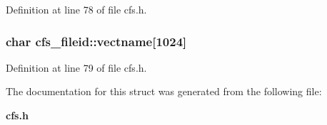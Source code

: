 Definition at line 78 of file cfs.h.
\subsubsection{\setlength{\rightskip}{0pt plus 5cm}char {\bf cfs\_\-fileid::vectname}[1024]}\label{structcfs__fileid_o3}




Definition at line 79 of file cfs.h.

The documentation for this struct was generated from the following file:\begin{CompactItemize}
\item 
{\bf cfs.h}\end{CompactItemize}
